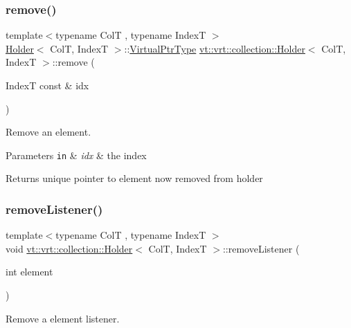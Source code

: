 \subsubsection{\texorpdfstring{remove()}{remove()}}
{\footnotesize\ttfamily template$<$typename ColT , typename IndexT $>$ \\
\hyperlink{structvt_1_1vrt_1_1collection_1_1_holder}{Holder}$<$ ColT, IndexT $>$\+::\hyperlink{structvt_1_1vrt_1_1collection_1_1_holder_a04ba57a7b2c48ce6b4c90d3f3b33f43c}{Virtual\+Ptr\+Type} \hyperlink{structvt_1_1vrt_1_1collection_1_1_holder}{vt\+::vrt\+::collection\+::\+Holder}$<$ ColT, IndexT $>$\+::remove (\begin{DoxyParamCaption}\item[{IndexT const \&}]{idx }\end{DoxyParamCaption})}



Remove an element. 


\begin{DoxyParams}[1]{Parameters}
\mbox{\tt in}  & {\em idx} & the index\\
\hline
\end{DoxyParams}
\begin{DoxyReturn}{Returns}
unique pointer to element now removed from holder 
\end{DoxyReturn}
\mbox{\label{structvt_1_1vrt_1_1collection_1_1_holder_ae54e9da47ea76dc7f6bb4cd12a135209}} 
\subsubsection{\texorpdfstring{remove\+Listener()}{removeListener()}}
{\footnotesize\ttfamily template$<$typename ColT , typename IndexT $>$ \\
void \hyperlink{structvt_1_1vrt_1_1collection_1_1_holder}{vt\+::vrt\+::collection\+::\+Holder}$<$ ColT, IndexT $>$\+::remove\+Listener (\begin{DoxyParamCaption}\item[{int}]{element }\end{DoxyParamCaption})}



Remove a element listener. 


